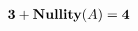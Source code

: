 \documentclass[preview]{standalone}
\begin{document}
\begin{align*}
\textbf{\text{3}} + \textbf{\text{Nullity}}(A) = \textbf{4}
\end{align*}
\end{document}
